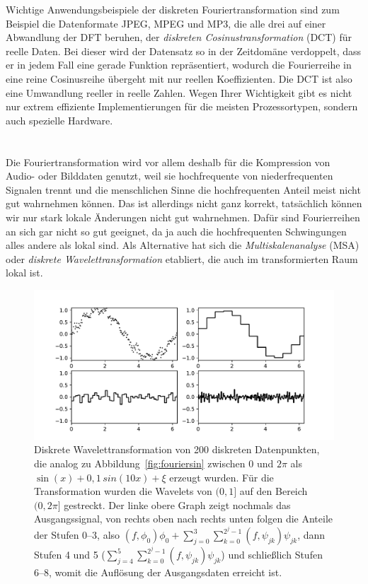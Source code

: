 Wichtige Anwendungsbeispiele der diskreten Fouriertransformation sind
zum Beispiel die Datenformate JPEG, MPEG und MP3, die alle drei auf
einer Abwandlung der DFT beruhen, der \emph{diskreten
  Cosinustransformation} (DCT) für reelle Daten. Bei dieser wird der
Datensatz so in der Zeitdomäne verdoppelt, dass er in jedem Fall eine
gerade Funktion repräsentiert, wodurch die Fourierreihe in eine reine
Cosinusreihe übergeht mit nur reellen Koeffizienten. Die DCT ist also
eine Umwandlung reeller in reelle Zahlen. Wegen Ihrer Wichtigkeit gibt
es nicht nur extrem effiziente Implementierungen für die meisten
Prozessortypen, sondern auch spezielle Hardware.

\section{}

Die Fouriertransformation wird vor allem deshalb für die Kompression
von Audio- oder Bilddaten genutzt, weil sie hochfrequente von
niederfrequenten Signalen trennt und die menschlichen Sinne die
hochfrequenten Anteil meist nicht gut wahrnehmen können. Das ist
allerdings nicht ganz korrekt, tatsächlich können wir nur stark lokale
Änderungen nicht gut wahrnehmen. Dafür sind Fourierreihen an sich gar
nicht so gut geeignet, da ja auch die hochfrequenten Schwingungen
alles andere als lokal sind. Als Alternative hat sich die
\emph{Multiskalenanalyse} (MSA) oder \emph{diskrete
  Wavelettransformation} etabliert, die auch im transformierten Raum
lokal ist.

\begin{figure}
  \centering
  \includegraphics[width=\textwidth]{plots/wavelet}
  \caption{Diskrete Wavelettransformation von 200 diskreten
    Datenpunkten, die analog zu Abbildung~\ref{fig:fouriersin} zwischen
    0 und $2\pi$ als $\sin(x) + 0,1\,sin(10 x) + \xi$ erzeugt
    wurden. Für die Transformation wurden die Wavelets von $(0,1]$ auf
    den Bereich $(0,2\pi]$ gestreckt. Der linke obere Graph zeigt
    nochmals das Ausgangssignal, von rechts oben nach rechts unten
    folgen die Anteile der Stufen 0--3, also $(f,\phi_0)\phi_0 +
    \sum_{j=0}^{3} \sum_{k=0}^{2^j-1} (f,\psi_{jk})\psi_{jk}$, dann
    Stufen 4 und 5 ($\sum_{j=4}^{5} \sum_{k=0}^{2^j-1}
    (f,\psi_{jk})\psi_{jk}$) und schließlich Stufen 6--8, womit die
    Auflösung der Ausgangsdaten erreicht ist.}
  \label{fig:dwt}
\end{figure}


